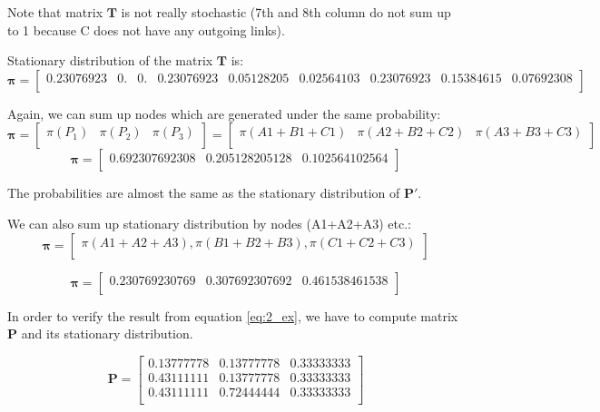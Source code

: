 \documentclass{article}
\begin{document}
Note that matrix $\mathbf{T}$ is not really stochastic (7th and 8th column do not sum up to 1 because  C does not have any outgoing links).

Stationary distribution of the matrix $\mathbf{T}$ is:
\[\mathbf{\pi} = \begin{bmatrix}
	0.23076923 & 0. &  0. & 0.23076923 &  0.05128205 &  0.02564103 &  0.23076923 & 0.15384615 & 0.07692308\\
	\end{bmatrix}
\]

Again, we can sum up nodes which are generated under the same probability:                   
\[\mathbf{\pi} = 
\begin{bmatrix}
\pi(P_1) & \pi(P_2) & \pi(P_3) \\
\end{bmatrix}
= \begin{bmatrix}
\pi(A1+B1+C1) & \pi(A2 + B2+C2) & \pi(A3 + B3 + C3) \\
\end{bmatrix}
\]
\[\mathbf{\pi} = 
\begin{bmatrix}
0.692307692308 & 0.205128205128 & 0.102564102564\\
\end{bmatrix}
\]

The probabilities are almost the same as the stationary distribution of $\mathbf{P'}$.


We can also sum up stationary distribution by nodes (A1+A2+A3) etc.:
\[\mathbf{\pi} = 
\begin{bmatrix}
\pi(A1+A2+A3), \pi(B1+B2+B3), \pi(C1+C2+C3) \\
\end{bmatrix}
\]


\begin{equation}
\mathbf{\pi} = 
\begin{bmatrix}
0.230769230769 & 0.307692307692 & 0.461538461538 \\
\end{bmatrix}
\label{eq:2_ex}
\end{equation}


In order to verify the result from equation \ref{eq:2_ex}, we have to compute matrix $\mathbf{P}$ and its stationary distribution.

\[\mathbf{P}=
\begin{bmatrix}
    0.13777778 &  0.13777778 &  0.33333333 \\
    0.43111111 & 0.13777778 & 0.33333333  \\
    0.43111111 & 0.72444444 & 0.33333333 \\
\end{bmatrix}
\]
\end{document}
